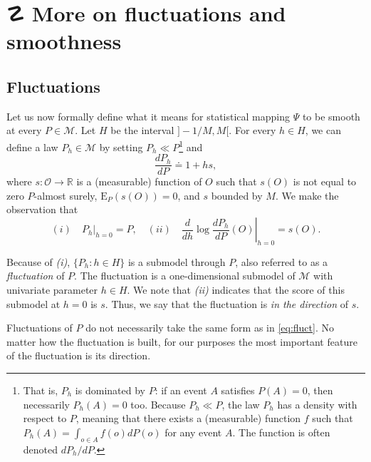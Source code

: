 \documentclass[11pt,openright,twoside]{book}
\DeclareRobustCommand{\stixdanger}{%
  {\usefont{U}{stixbbit}{m}{it}\symbol{"F6}}%
}
\newcommand{\bbR}{\mathbb{R}}
\newcommand{\defq}{\doteq}
\newcommand{\calM}{\mathcal{M}}
\newcommand{\calO}{\mathcal{O}}
\newcommand{\Exp}{\textrm{E}}
\theoremstyle{definition}
\theoremstyle{definition}
\theoremstyle{definition}
\theoremstyle{remark}
\begin{document}
\hypertarget{smooth-second-pass}{%
\section{\texorpdfstring{☡ \stixdanger{} More on fluctuations and smoothness}{☡  More on fluctuations and smoothness}}\label{smooth-second-pass}}

\hypertarget{smooth-second-pass-fluctuations}{%
\subsection{Fluctuations}\label{smooth-second-pass-fluctuations}}

Let us now formally define what it means for statistical mapping \(\Psi\) to be
smooth at every \(P \in \calM\). Let \(H\) be the interval \(]-1/M,M[\). For every
\(h \in H\), we can define a law \(P_{h} \in \calM\) by setting \(P_{h} \ll P\)\footnote{That is, \(P_{h}\) is dominated by \(P\): if an event \(A\) satisfies \(P(A) = 0\), then necessarily \(P_{h} (A) = 0\) too. Because \(P_{h} \ll P\), the law
  \(P_{h}\) has a density with respect to \(P\), meaning that there exists a
  (measurable) function \(f\) such that \(P_{h}(A) = \int_{o \in A} f(o) dP(o)\) for
  any event \(A\). The function is often denoted \(dP_{h}/dP\).} and
\begin{equation} \frac{dP_h}{dP} \defq 1 + h s, 
\label{eq:fluct} \end{equation}
where \(s : \calO\to \bbR\) is a (measurable) function of \(O\) such that \(s(O)\)
is not equal to zero \(P\)-almost surely, \(\Exp_{P} (s(O)) = 0\), and \(s\) bounded
by \(M\). We make the observation that
\begin{equation} (i) \quad P_h|_{h=0} =
P,\quad  (ii)  \quad \left.\frac{d}{dh}  \log  \frac{dP_h}{dP}(O)\right|_{h=0}
=s(O).  \label{eq:score} 
\end{equation}

Because of \emph{(i)}, \(\{P_{h} : h \in H\}\) is a submodel through \(P\), also
referred to as a \emph{fluctuation} of \(P\). The fluctuation is a one-dimensional
submodel of \(\calM\) with univariate parameter \(h \in H\). We note that \emph{(ii)}
indicates that the score of this submodel at \(h = 0\) is \(s\). Thus, we say
that the fluctuation is \emph{in the direction} of \(s\).

Fluctuations of \(P\) do not necessarily take the same form as in
\eqref{eq:fluct}. No matter how the fluctuation is built, for our purposes the
most important feature of the fluctuation is its direction.
\end{document}
